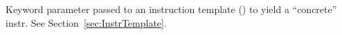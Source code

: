
Keyword parameter passed to an instruction template () to yield a ``concrete''  instr.
See Section~\ref{sec:InstrTemplate}.


